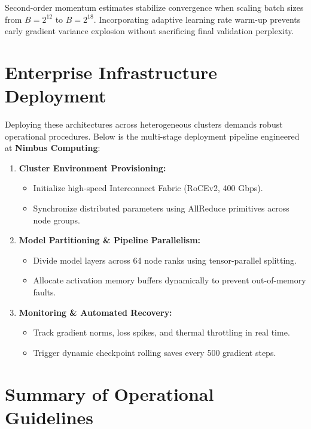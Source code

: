 \documentclass[
  11pt,
  a4paper,
  twoside=true,
  headsepline=0.8pt,
  footsepline=false,
  open=right,
  numbers=noenddot,
  chapterprefix=false,
  BCOR=6mm
]{scrbook}
\begin{document}
\begin{keytakeaway}
Second-order momentum estimates stabilize convergence when scaling batch sizes from $B = 2^{12}$ to $B = 2^{18}$. Incorporating adaptive learning rate warm-up prevents early gradient variance explosion without sacrificing final validation perplexity.
\end{keytakeaway}

\section{Enterprise Infrastructure Deployment}

Deploying these architectures across heterogeneous clusters demands robust operational procedures. Below is the multi-stage deployment pipeline engineered at \textbf{Nimbus Computing}:

\begin{enumerate}
  \item \textbf{Cluster Environment Provisioning:}
    \begin{itemize}
      \item Initialize high-speed Interconnect Fabric (RoCEv2, 400 Gbps).
      \item Synchronize distributed parameters using AllReduce primitives across node groups.
    \end{itemize}

  \item \textbf{Model Partitioning \& Pipeline Parallelism:}
    \begin{itemize}
      \item Divide model layers across 64 node ranks using tensor-parallel splitting.
      \item Allocate activation memory buffers dynamically to prevent out-of-memory faults.
    \end{itemize}

  \item \textbf{Monitoring \& Automated Recovery:}
    \begin{itemize}
      \item Track gradient norms, loss spikes, and thermal throttling in real time.
      \item Trigger dynamic checkpoint rolling saves every 500 gradient steps.
    \end{itemize}
\end{enumerate}

\section{Summary of Operational Guidelines}
\end{document}
